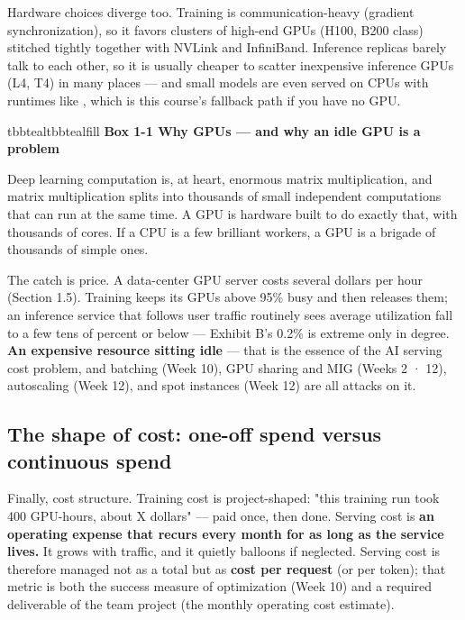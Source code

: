 Hardware choices diverge too. Training is communication-heavy (gradient synchronization), so it favors clusters of high-end GPUs (H100, B200 class) stitched tightly together with NVLink and InfiniBand. Inference replicas barely talk to each other, so it is usually cheaper to scatter inexpensive inference GPUs (L4, T4) in many places — and small models are even served on CPUs with runtimes like , which is this course's fallback path if you have no GPU.

\begin{calloutbox}{tbbteal}{tbbtealfill}
{\normalsize\bfseries\color{tbbx115E59}Box 1-1  Why GPUs — and why an idle GPU is a problem}\par\vspace{3pt}
Deep learning computation is, at heart, enormous matrix multiplication, and matrix multiplication splits into thousands of small independent computations that can run at the same time. A GPU is hardware built to do exactly that, with thousands of cores. If a CPU is a few brilliant workers, a GPU is a brigade of thousands of simple ones.

The catch is price. A data-center GPU server costs several dollars per hour (Section 1.5). Training keeps its GPUs above 95\% busy and then releases them; an inference service that follows user traffic routinely sees average utilization fall to a few tens of percent or below — Exhibit B's 0.2\% is extreme only in degree. \textbf{An expensive resource sitting idle} — that is the essence of the AI serving cost problem, and batching (Week 10), GPU sharing and MIG (Weeks 2 · 12), autoscaling (Week 12), and spot instances (Week 12) are all attacks on it.
\end{calloutbox}

\vspace{3.0pt}

\subsection*{The shape of cost: one-off spend versus continuous spend}

Finally, cost structure. Training cost is project-shaped: "this training run took 400 GPU-hours, about X dollars" — paid once, then done. Serving cost is \textbf{an operating expense that recurs every month for as long as the service lives.} It grows with traffic, and it quietly balloons if neglected. Serving cost is therefore managed not as a total but as \textbf{cost per request} (or per token); that metric is both the success measure of optimization (Week 10) and a required deliverable of the team project (the monthly operating cost estimate).

